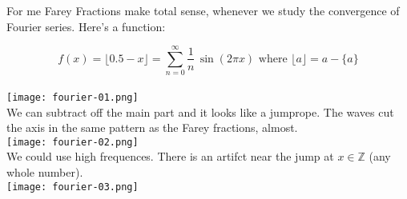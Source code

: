 \documentclass[12pt]{article}
\begin{document}
\newpage

\noindent For me Farey Fractions make total sense, whenever we study the convergence of Fourier series.  Here's a function:

$$ f(x) = 
\big\lfloor 0.5 - x \big\rfloor = \sum_{n= 0 }^\infty \frac{1}{n} \,\sin (2\pi x) \text{ where } \lfloor a \rfloor = a - \{ a \} $$
\\
\texttt{[image: fourier-01.png]} \\
We can subtract off the main part and it looks like a jumprope.  The waves cut the axis in the same pattern as the Farey fractions, almost. \\
\texttt{[image: fourier-02.png]} \\
We could use high frequences. There is an artifct near the jump at $x \in \mathbb{Z}$ (any whole number).\\
\texttt{[image: fourier-03.png]} \\
\end{document}
